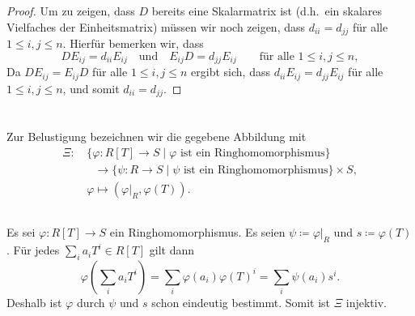 \documentclass[a4paper, 10pt, numbers=noenddot]{scrartcl}
\begin{document}
\begin{proof}
  Um zu zeigen, dass $D$ bereits eine Skalarmatrix ist (d.h.\ ein skalares Vielfaches der Einheitsmatrix) müssen wir noch zeigen, dass $d_{ii} = d_{jj}$ für alle $1 \leq i,j \leq n$.
  Hierfür bemerken wir, dass
  \[
    D E_{ij} = d_{ii} E_{ij}
    \quad\text{und}\quad
    E_{ij} D = d_{jj} E_{ij}
    \qquad
    \text{für alle $1 \leq i,j \leq n$},
  \]
  Da $D E_{ij} = E_{ij} D$ für alle $1 \leq i,j \leq n$ ergibt sich, dass $d_{ii} E_{ij} = d_{jj} E_{ij}$ für alle $1 \leq i,j \leq n$, und somit $d_{ii} = d_{jj}$.
\end{proof}























\section{}

Zur Belustigung bezeichnen wir die gegebene Abbildung mit
\begin{align*}
              \Xi
  \colon&\,   \{ \varphi  \colon R[T] \to S \mid \text{$\varphi$ ist ein Ringhomomorphismus} \}
  \\
        &\,   \phantom{\varphi} \to \{ \psi \colon R \to S        \mid \text{$\psi$ ist ein Ringhomomorphismus} \}
                                    \times S,
  \\
         &\,  \varphi
  \mapsto     (\varphi|_R, \varphi(T)).
\end{align*}





\subsection{}

Es sei $\varphi \colon R[T] \to S$ ein Ringhomomorphismus.
Es seien $\psi \coloneqq \varphi|_R$ und $s \coloneqq \varphi(T)$.
Für jedes $\sum_i a_i T^i \in R[T]$ gilt dann
\[
    \varphi\left( \sum_i a_i T^i \right)
  = \sum_i \varphi(a_i) \varphi(T)^i
  = \sum_i \psi(a_i) s^i.
\]
Deshalb ist $\varphi$ durch $\psi$ und $s$ schon eindeutig bestimmt.
Somit ist $\Xi$ injektiv.
\end{document}
